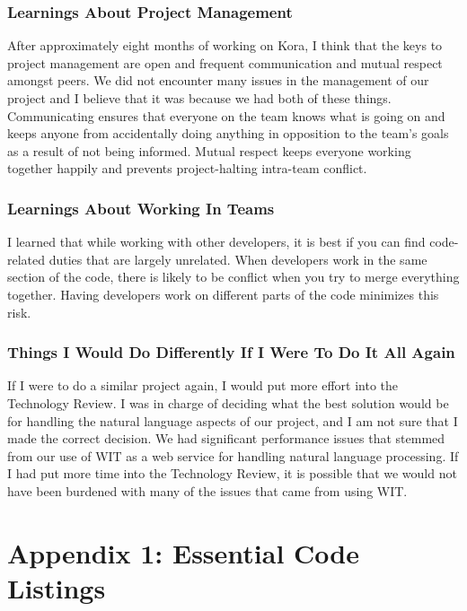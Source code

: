 \documentclass[onecolumn, draftclsnofoot,10pt, compsoc]{IEEEtran}
\begin{document}
	\subsubsection{Learnings About Project Management}
		After approximately eight months of working on Kora, I think that the keys to project management are open and frequent communication and mutual respect amongst peers.
		We did not encounter many issues in the management of our project and I believe that it was because we had both of these things.
		Communicating ensures that everyone on the team knows what is going on and keeps anyone from accidentally doing anything in opposition to the team's goals as a result of not being informed.
		Mutual respect keeps everyone working together happily and prevents project-halting intra-team conflict.

	\subsubsection{Learnings About Working In Teams}
		I learned that while working with other developers, it is best if you can find code-related duties that are largely unrelated.
		When developers work in the same section of the code, there is likely to be conflict when you try to merge everything together.
		Having developers work on different parts of the code minimizes this risk.

	\subsubsection{Things I Would Do Differently If I Were To Do It All Again}
		If I were to do a similar project again, I would put more effort into the Technology Review.
		I was in charge of deciding what the best solution would be for handling the natural language aspects of our project, and I am not sure that I made the correct decision.
		We had significant performance issues that stemmed from our use of WIT as a web service for handling natural language processing.
		If I had put more time into the Technology Review, it is possible that we would not have been burdened with many of the issues that came from using WIT.






\section{Appendix 1: Essential Code Listings}









	
	
\end{document}
